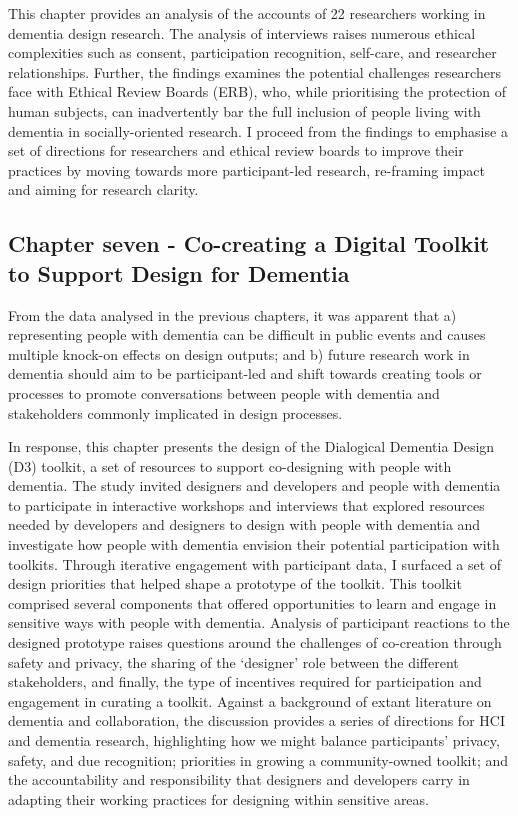 This chapter provides an analysis of the accounts of 22 researchers working in dementia design research. The analysis of interviews raises numerous ethical complexities such as consent, participation recognition, self-care, and researcher relationships. Further, the findings examines the potential challenges researchers face with Ethical Review Boards (ERB), who, while prioritising the protection of human subjects, can inadvertently bar the full inclusion of people living with dementia in socially-oriented research. I proceed from the findings to emphasise a set of directions for researchers and ethical review boards to improve their practices by moving towards more participant-led research, re-framing impact and aiming for research clarity.

\subsection{Chapter seven - Co-creating a Digital Toolkit to Support Design for Dementia}
\label{Intro:ChapterSeven}
From the data analysed in the previous chapters, it was apparent that a) representing people with dementia can be difficult in public events and causes multiple knock-on effects on design outputs; and b) future research work in dementia should aim to be participant-led and shift towards creating tools or processes to promote conversations between people with dementia and stakeholders commonly implicated in design processes.

In response, this chapter presents the design of the Dialogical Dementia Design (D3) toolkit, a set of resources to support co-designing with people with dementia. The study invited designers and developers and people with dementia to participate in interactive workshops and interviews that explored resources needed by developers and designers to design with people with dementia and investigate how people with dementia envision their potential participation with toolkits. Through iterative engagement with participant data, I surfaced a set of design priorities that helped shape a prototype of the toolkit. This toolkit comprised several components that offered opportunities to learn and engage in sensitive ways with people with dementia. Analysis of participant reactions to the designed prototype raises questions around the challenges of co-creation through safety and privacy, the sharing of the ‘designer’ role between the different stakeholders, and finally, the type of incentives required for participation and engagement in curating a toolkit. Against a background of extant literature on dementia and collaboration, the discussion provides a series of directions for HCI and dementia research, highlighting how we might balance participants' privacy, safety, and due recognition; priorities in growing a community-owned toolkit; and the accountability and responsibility that designers and developers carry in adapting their working practices for designing within sensitive areas.
